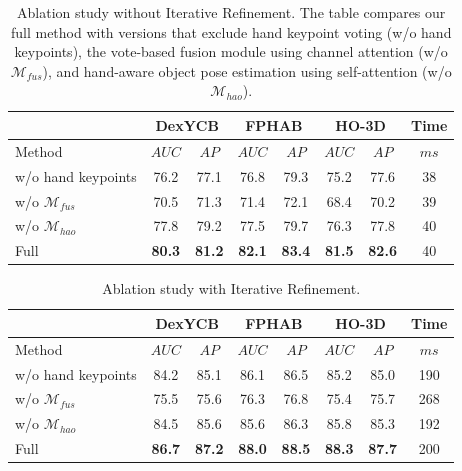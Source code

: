 \begin{table}[h]
\caption{Ablation study without Iterative Refinement. The table compares our full method with versions that exclude hand keypoint voting (w/o hand keypoints), the vote-based fusion module using channel attention (w/o $\mathcal{M}_{fus}$), and hand-aware object pose estimation using self-attention (w/o $\mathcal{M}_{hao}$).}
\label{tab:ablation_without_ir}
\begin{center}
\begin{tabular}{|l|c|c|c|c|c|c|c|} 
\hline
& \multicolumn{2}{c|}{DexYCB} & \multicolumn{2}{c|}{FPHAB} & \multicolumn{2}{c|}{HO-3D} & Time \\
\hline
Method & $AUC$ & $AP$ & $AUC$ & $AP$ & $AUC$ & $AP$ & $ms$ \\  
\hline 
w/o hand keypoints & 76.2 & 77.1 & 76.8 & 79.3 & 75.2 & 77.6 & 38 \\

w/o $\mathcal{M}_{fus}$ & 70.5 & 71.3 & 71.4 & 72.1 & 68.4 & 70.2 & 39 \\

w/o $\mathcal{M}_{hao}$ & 77.8 & 79.2 & 77.5 & 79.7 & 76.3 & 77.8 & 40 \\

Full & \textbf{80.3} & \textbf{81.2} & \textbf{82.1} & \textbf{83.4} & \textbf{81.5} & \textbf{82.6} & 40 \\
\hline
\end{tabular}
\end{center}
\end{table}

\begin{table}[h]
\caption{Ablation study with Iterative Refinement.}
\label{tab:ablation_with_ir}
\begin{center}
\begin{tabular}{|l|c|c|c|c|c|c|c|} 
\hline
& \multicolumn{2}{c|}{DexYCB} & \multicolumn{2}{c|}{FPHAB} & \multicolumn{2}{c|}{HO-3D} & Time \\
\hline
Method & $AUC$ & $AP$ & $AUC$ & $AP$ & $AUC$ & $AP$ & $ms$ \\  
\hline 
w/o hand keypoints & 84.2 & 85.1 & 86.1 & 86.5 & 85.2 & 85.0 & 190 \\

w/o $\mathcal{M}_{fus}$ & 75.5 & 75.6 & 76.3 & 76.8 & 75.4 & 75.7 & 268 \\

w/o $\mathcal{M}_{hao}$ & 84.5 & 85.6 & 85.6 & 86.3 & 85.8 & 85.3 & 192 \\

Full & \textbf{86.7} & \textbf{87.2} & \textbf{88.0} & \textbf{88.5} & \textbf{88.3} & \textbf{87.7} & 200 \\
\hline
\end{tabular}
\end{center}
\end{table}


